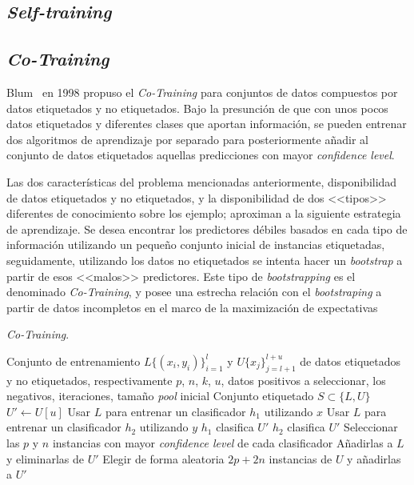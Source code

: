 \subsection{\textit{Self-training}}



\subsection{\textit{Co-Training}}
Blum~\cite{blum1998combining} en 1998 propuso el \textit{Co-Training} para conjuntos de datos compuestos por datos etiquetados y no etiquetados. Bajo la presunción de que con unos pocos datos etiquetados y diferentes clases que aportan información, se pueden entrenar dos algoritmos de aprendizaje por separado para posteriormente añadir al conjunto de datos etiquetados aquellas predicciones con mayor \textit{confidence level}.

Las dos características del problema mencionadas anteriormente, disponibilidad de datos etiquetados y no etiquetados, y la disponibilidad de dos <<tipos>> diferentes de conocimiento sobre los ejemplo; aproximan a la siguiente estrategia de aprendizaje. Se desea encontrar los predictores débiles basados en cada tipo de información utilizando un pequeño conjunto inicial de instancias etiquetadas, seguidamente, utilizando los datos no etiquetados se intenta hacer un \textit{bootstrap} a partir de esos <<malos>> predictores. Este tipo de \textit{bootstrapping} es el denominado \textit{Co-Training}, y posee una estrecha relación con el \textit{bootstraping} a partir de datos incompletos en el marco de la maximización de expectativas~\cite{ghahramani1994supervised, ratsaby1995learning}

\begin{algorithm}[H]
\caption{\textit{Co-Training}.}\label{alg:Co-Training}
\begin{algorithmic}[1]
\Require Conjunto de entrenamiento $L \lbrace\left(x_i, y_i\right)\rbrace_{i=1}^l$ y $U \lbrace x_j \rbrace_{j=l+1}^{l+u}$ de datos etiquetados y no etiquetados, respectivamente
\Require $p$, $n$, $k$, $u$, datos positivos a seleccionar, los negativos, iteraciones, tamaño \textit{pool} inicial
\Ensure Conjunto etiquetado $S \subset \lbrace L,U \rbrace$
\Statex
{}
	\State $U' \leftarrow U[u]$
		\State Usar $L$ para entrenar un clasificador $h_1$ utilizando $x$
		\State Usar $L$ para entrenar un clasificador $h_2$ utilizando $y$
		\State $h_1$ clasifica $U'$
		\State $h_2$ clasifica $U'$
		\State Seleccionar las $p$ y $n$ instancias con mayor \textit{confidence level} de cada clasificador
		\State Añadirlas a $L$ y eliminarlas de $U'$
		\State Elegir de forma aleatoria $2p+2n$ instancias de $U$ y añadirlas a $U'$
	\EndFor
\EndProcedure
\end{algorithmic}
\end{algorithm}

